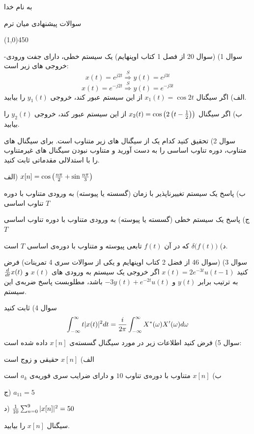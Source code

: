 \documentclass[50pt]{article}
\newcommand{\hl}{
\begin{center}
\line(1,0){450}
\end{center}}
\begin{document}
\setLTR 




\begin{RTL}
\Large{








\begin{center}
به نام خدا

سوالات پیشنهادی میان ترم
\end{center}
\hl
سوال 1) (سوال 20 از فصل 1 کتاب اوپنهایم) یک سیستم خطی، دارای جفت ورودی-خروجی های زیر است:
$$
x(t)=e^{j2t}\overset{S}{\Longrightarrow}y(t)=e^{j3t}
$$
$$
x(t)=e^{-j2t}\overset{S}{\Longrightarrow}y(t)=e^{-j3t}
$$
الف) اگر سیگنال 
$x_1(t)=\cos 2t$
از این سیستم عبور کند، خروجی $y_1(t)$ را بیابید.

ب) اگر سیگنال 
$x_2(t)=\cos \left(2\left(t-{1\over 2}\right)\right)$
از این سیستم عبور کند، خروجی $y_2(t)$ را بیابید.

سوال 2) تحقیق کنید کدام یک از سیگنال های زیر متناوب است. برای سیگنال های متناوب، دوره تناوب اساسی را به دست آورید و متناوب نبودن سیگنال های غیرمتناوب را با استدلالی مقدماتی ثابت کنید.

الف)
$x[n]=\cos\left({n\pi \over 2}+\sin {n\pi \over 3}\right)$

ب) پاسخ یک سیستم تغییرناپذیر با زمان (گسسته یا پیوسته) به ورودی متناوب با دوره تناوب اساسی $T$

ج) پاسخ یک سیستم خطی (گسسته یا پیوسته) به ورودی متناوب با دوره تناوب اساسی $T$

د) 
$\delta\Big(f(t)\Big)$
 که در آن $f(t)$ تابعی پیوسته و متناوب با دوره‌ی اساسی $T$ است.

سوال 3) (سوال 46 از فضل 2 کتاب اوپنهایم و یکی از سوالات سری 4 تمرینات) فرض کنید 
$x(t)=2e^{-3t}u(t-1)$
اگر خروجی یک سیستم  به ورودی های $x(t)$ و 
${d\over dt}x(t)$
به ترتیب برابر $y(t)$ و 
$-3y(t)+e^{-2t}u(t)$
 باشد، مطلوبست پاسخ ضربه‌ی این سیستم.

سوال 4) ثابت کنید
$$\int_{-\infty}^{\infty}t|x(t)|^2dt={i\over 2\pi}\int_{-\infty}^{\infty}X^*(\omega)X'(\omega)d\omega$$
سوال 5) فرض کنید اطلاعات زیر در مورد سیگنال گسسته‌ی
$x[n]$
 داده شده است:

الف) $x[n]$ حقیقی و زوج است

ب) $x[n]$ متناوب با دوره‌ی تناوب $10$ و دارای ضرایب سری فوریه‌ی $a_k$ است

ج) $a_{11}=5$

د)
${1\over 10}\sum_{n=0}^{9}|x[n]|^2=50$

سیگنال $x[n]$ را بیابید.

}
\end{RTL}
\end{document}
